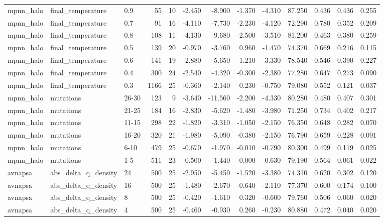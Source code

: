 \begin{table}
\begin{tabular}{lllrrrrrrrrrr}
mpnn\_halo & final\_temperature & 0.9 & 55 & 10 & -2.450 & -8.900 & -1.370 & -4.310 & 87.250 & 0.436 & 0.436 & 0.255 \\
mpnn\_halo & final\_temperature & 0.7 & 91 & 16 & -4.110 & -7.730 & -2.230 & -4.120 & 72.290 & 0.780 & 0.352 & 0.209 \\
mpnn\_halo & final\_temperature & 0.8 & 108 & 11 & -4.130 & -9.680 & -2.500 & -3.510 & 81.200 & 0.463 & 0.380 & 0.259 \\
mpnn\_halo & final\_temperature & 0.5 & 139 & 20 & -0.970 & -3.760 & 0.960 & -1.470 & 74.370 & 0.669 & 0.216 & 0.115 \\
mpnn\_halo & final\_temperature & 0.6 & 141 & 19 & -2.880 & -5.650 & -1.210 & -3.330 & 78.540 & 0.546 & 0.390 & 0.227 \\
mpnn\_halo & final\_temperature & 0.4 & 300 & 24 & -2.540 & -4.320 & -0.300 & -2.380 & 77.280 & 0.647 & 0.273 & 0.090 \\
mpnn\_halo & final\_temperature & 0.3 & 1166 & 25 & -0.360 & -2.140 & 0.230 & -0.750 & 79.080 & 0.552 & 0.121 & 0.037 \\
mpnn\_halo & mutations & 26-30 & 123 & 9 & -3.640 & -11.560 & -2.200 & -4.330 & 80.280 & 0.480 & 0.407 & 0.301 \\
mpnn\_halo & mutations & 21-25 & 184 & 16 & -2.830 & -5.620 & -1.480 & -3.980 & 71.250 & 0.734 & 0.402 & 0.217 \\
mpnn\_halo & mutations & 11-15 & 298 & 22 & -1.820 & -3.310 & -1.050 & -2.150 & 76.350 & 0.648 & 0.282 & 0.070 \\
mpnn\_halo & mutations & 16-20 & 320 & 21 & -1.980 & -5.090 & -0.380 & -2.150 & 76.790 & 0.659 & 0.228 & 0.091 \\
mpnn\_halo & mutations & 6-10 & 479 & 25 & -0.670 & -1.970 & -0.010 & -0.790 & 80.300 & 0.499 & 0.119 & 0.025 \\
mpnn\_halo & mutations & 1-5 & 511 & 23 & -0.500 & -1.440 & 0.000 & -0.630 & 79.190 & 0.564 & 0.061 & 0.022 \\
avnapsa & abs\_delta\_q\_density & 24 & 500 & 25 & -2.950 & -5.450 & -1.520 & -3.380 & 74.310 & 0.620 & 0.302 & 0.120 \\
avnapsa & abs\_delta\_q\_density & 16 & 500 & 25 & -1.480 & -2.670 & -0.640 & -2.110 & 77.370 & 0.600 & 0.174 & 0.100 \\
avnapsa & abs\_delta\_q\_density & 8 & 500 & 25 & -0.420 & -1.610 & 0.320 & -0.600 & 79.760 & 0.506 & 0.060 & 0.020 \\
avnapsa & abs\_delta\_q\_density & 4 & 500 & 25 & -0.460 & -0.930 & 0.260 & -0.230 & 80.880 & 0.472 & 0.040 & 0.020 \\

\end{tabular}
\end{table}
